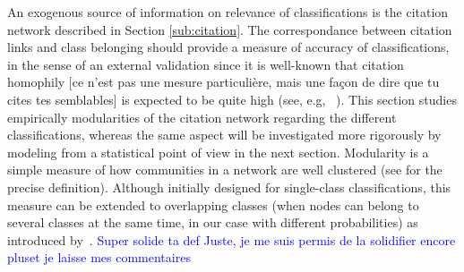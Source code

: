\documentclass[10pt,A4]{article}
\begin{document}
An exogenous source of information on relevance of classifications is the citation network described in Section \ref{sub:citation}. The correspondance between citation links and class belonging should provide a measure of accuracy of classifications, in the sense of an external validation since it is well-known that citation homophily [ce n'est pas une mesure particulière, mais une façon de dire que tu cites tes semblables] is expected to be quite high (see, e.g, ~\cite{AAKnetwork2016}). This section studies empirically modularities of the citation network regarding the different classifications, whereas the same aspect will be investigated more rigorously by modeling from a statistical point of view in the next section. Modularity is a simple measure of how communities in a network are well clustered (see \cite{clauset2004finding} for the precise definition). Although initially designed for single-class classifications, this measure can be extended to overlapping classes (when nodes can belong to several classes at the same time, in our case with different probabilities) as introduced by~\cite{nicosia2009extending}. \textcolor{blue}{Super solide ta def Juste, je me suis permis de la solidifier encore pluset je laisse mes commentaires}
\end{document}
